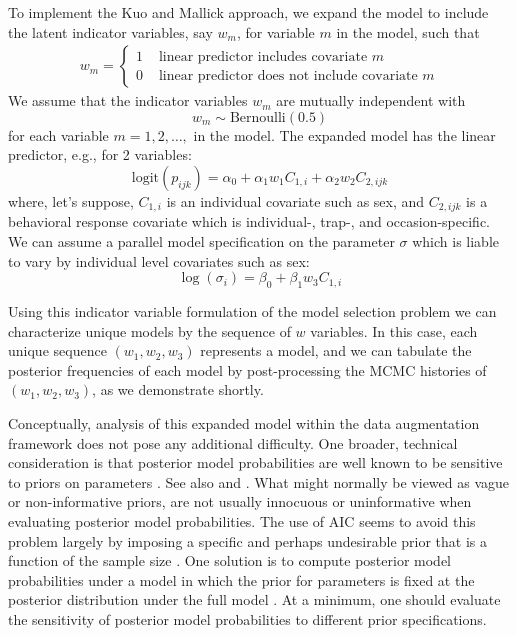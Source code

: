 To implement the Kuo and Mallick approach, we expand the model to
include the latent indicator variables, say $w_{m}$, for variable $m$
in the model, such that
\begin{eqnarray*}
w_{m} = \left\{
\begin{array}{cl} 1 &  \mbox{ linear predictor includes  covariate $m$} \\
                  0 &  \mbox{ linear predictor does not
                                include covariate $m$}
 \end{array}
\right.
\end{eqnarray*}
We assume that the indicator variables $w_{m}$ are mutually
independent with
\[
w_m \sim \mbox{Bernoulli}(0.5)
\]
for each variable $m=1,2,\ldots,$ in the model.
The expanded model has the linear predictor, e.g., for 2 variables:
\[
\mbox{logit}(p_{ijk}) = \alpha_{0} + \alpha_{1}w_{1} C_{1,i} + \alpha_{2}w_{2} C_{2,ijk}
\]
where, let's suppose, $C_{1,i}$ is an individual covariate such
as sex, and $C_{2,ijk}$ is a behavioral response covariate which is
individual-, trap-, and occasion-specific.  We can assume a parallel
model specification on the parameter $\sigma$ which is liable to vary
by individual level covariates such as sex:
\[
 \log(\sigma_{i}) = \beta_{0} + \beta_{1} w_{3} C_{1,i}
\]

Using this indicator variable formulation of the model selection
problem we can characterize unique models by the sequence of $w$
variables. In this case, each unique sequence $(w_{1},w_{2},w_{3})$
represents a model, and we can tabulate the posterior frequencies of
each model by post-processing the MCMC histories of
$(w_{1},w_{2},w_{3})$, as we demonstrate shortly.

Conceptually, analysis of this expanded model within the data
augmentation framework does not pose any additional difficulty. One
broader, technical consideration is that posterior model probabilities
are well known to be sensitive to priors on parameters
\citep{aitkin:1991, link_barker:2006}. See also 
\citet[][Sec. 3.4.3]{royle_dorazio:2008} and
\citet[][Sec. 7.2.5]{link_barker:2010}.  What might normally be viewed
as vague or non-informative priors, are not usually innocuous or
uninformative when evaluating posterior model probabilities. The use
of AIC seems to avoid this problem largely by imposing a specific and
perhaps undesirable prior that is a function of the sample size
\citep{kadane_lazar:2004}. One solution is to compute posterior model
probabilities under a model in which the prior for parameters is fixed
at the posterior distribution under the full model
\citep{aitkin:1991}. At a minimum, one should evaluate the sensitivity
of posterior model probabilities to different prior specifications.


